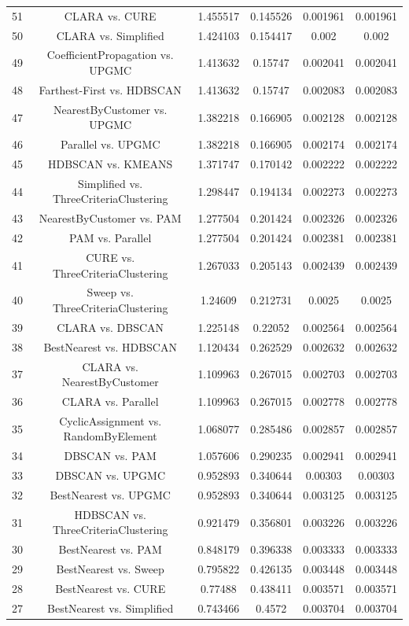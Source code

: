 \documentclass[a4paper,10pt]{article}
\begin{document}
\begin{landscape}
\begin{table}[!htp]
\begin{tabular}{cccccc}
51&CLARA vs. CURE&1.455517&0.145526&0.001961&0.001961\\
50&CLARA vs. Simplified&1.424103&0.154417&0.002&0.002\\
49&CoefficientPropagation vs. UPGMC&1.413632&0.15747&0.002041&0.002041\\
48&Farthest-First vs. HDBSCAN&1.413632&0.15747&0.002083&0.002083\\
47&NearestByCustomer vs. UPGMC&1.382218&0.166905&0.002128&0.002128\\
46&Parallel vs. UPGMC&1.382218&0.166905&0.002174&0.002174\\
45&HDBSCAN vs. KMEANS&1.371747&0.170142&0.002222&0.002222\\
44&Simplified vs. ThreeCriteriaClustering&1.298447&0.194134&0.002273&0.002273\\
43&NearestByCustomer vs. PAM&1.277504&0.201424&0.002326&0.002326\\
42&PAM vs. Parallel&1.277504&0.201424&0.002381&0.002381\\
41&CURE vs. ThreeCriteriaClustering&1.267033&0.205143&0.002439&0.002439\\
40&Sweep vs. ThreeCriteriaClustering&1.24609&0.212731&0.0025&0.0025\\
39&CLARA vs. DBSCAN&1.225148&0.22052&0.002564&0.002564\\
38&BestNearest vs. HDBSCAN&1.120434&0.262529&0.002632&0.002632\\
37&CLARA vs. NearestByCustomer&1.109963&0.267015&0.002703&0.002703\\
36&CLARA vs. Parallel&1.109963&0.267015&0.002778&0.002778\\
35&CyclicAssignment vs. RandomByElement&1.068077&0.285486&0.002857&0.002857\\
34&DBSCAN vs. PAM&1.057606&0.290235&0.002941&0.002941\\
33&DBSCAN vs. UPGMC&0.952893&0.340644&0.00303&0.00303\\
32&BestNearest vs. UPGMC&0.952893&0.340644&0.003125&0.003125\\
31&HDBSCAN vs. ThreeCriteriaClustering&0.921479&0.356801&0.003226&0.003226\\
30&BestNearest vs. PAM&0.848179&0.396338&0.003333&0.003333\\
29&BestNearest vs. Sweep&0.795822&0.426135&0.003448&0.003448\\
28&BestNearest vs. CURE&0.77488&0.438411&0.003571&0.003571\\
27&BestNearest vs. Simplified&0.743466&0.4572&0.003704&0.003704\\

\end{tabular}
\end{table}
\end{landscape}
\end{document}
